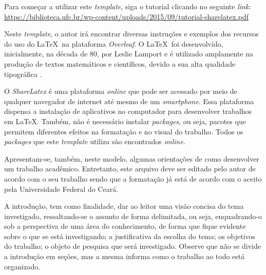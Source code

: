 










Para começar a utilizar este \textit{template}, siga o tutorial clicando no seguinte \textit{link}:
\url{https://biblioteca.ufc.br/wp-content/uploads/2015/09/tutorial-sharelatex.pdf}

Neste \textit{template}, o autor irá encontrar diversas instruções e exemplos dos recursos do uso do \LaTeX~na plataforma \textit{Overleaf}. O \LaTeX~foi desenvolvido, inicialmente, na década de 80, por Leslie Lamport e é utilizado amplamente na produção de textos matemáticos e científicos, devido a sua alta qualidade tipográfica \cite{goossens1994latex}. 

O \textit{ShareLatex} é uma plataforma \textit{online} que pode ser acessado por meio de qualquer navegador de internet até mesmo de um \textit{smartphone}. Essa plataforma dispensa a instalação de aplicativos no computador para desenvolver trabalhos em \LaTeX. Também, não é necessário instalar \textit{packages}, ou seja, pacotes que permitem diferentes efeitos na formatação e no visual do trabalho. Todos os \textit{packages} que este \textit{template} utiliza são encontrados \textit{online}. 

Apresentam-se, também, neste modelo, algumas orientações de como desenvolver um trabalho acadêmico. Entretanto, este arquivo deve ser editado pelo autor de acordo com o seu trabalho sendo que a formatação já está de acordo com o aceito pela Universidade Federal do Ceará.  

A introdução, tem como finalidade, dar ao leitor uma visão concisa do tema investigado, ressaltando-se o assunto de forma delimitada, ou seja, enquadrando-o sob a perspectiva de uma área do conhecimento, de forma que fique evidente sobre o que se está investigando; a justificativa da escolha do tema; os objetivos do trabalho; o objeto de pesquisa que será investigado. Observe que não se divide a introdução em seções, mas a mesma informa como o trabalho ao todo está organizado.


